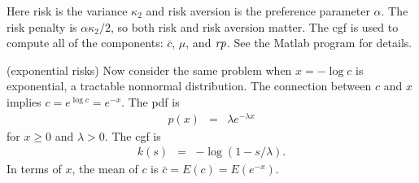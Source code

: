 \documentclass[11pt]{exam}
\begin{document}
\begin{questions}

\begin{solution}
Here risk is the variance $\kappa_2$ and risk aversion is the preference
parameter $\alpha$.
The risk penalty is $\alpha\kappa_2/2$, so both risk and risk aversion matter.
The cgf is used to compute all of the components:
$\bar{c}$, $\mu$, and $\mbox{\it rp\/}$.
See the Matlab program for details.
\end{solution}

\question (exponential risks)
Now consider the same problem when $x = - \log c $ is exponential,
a tractable nonnormal distribution.
The connection between $c$ and $x$ implies $c = e^{\log c} = e^{-x}$.
The pdf is
\begin{eqnarray*}
    p(x)  &=& \lambda e^{-\lambda x}
\end{eqnarray*}
for $x \geq 0$ and $\lambda > 0$.
The cgf is
\begin{eqnarray*}
    k(s)  &=& - \log \left( 1 - s/\lambda \right) .
\end{eqnarray*}
In terms of $x$, the mean of $c$ is $\bar{c} = E(c) = E (e^{-x})$.



\end{questions}
\end{document}
